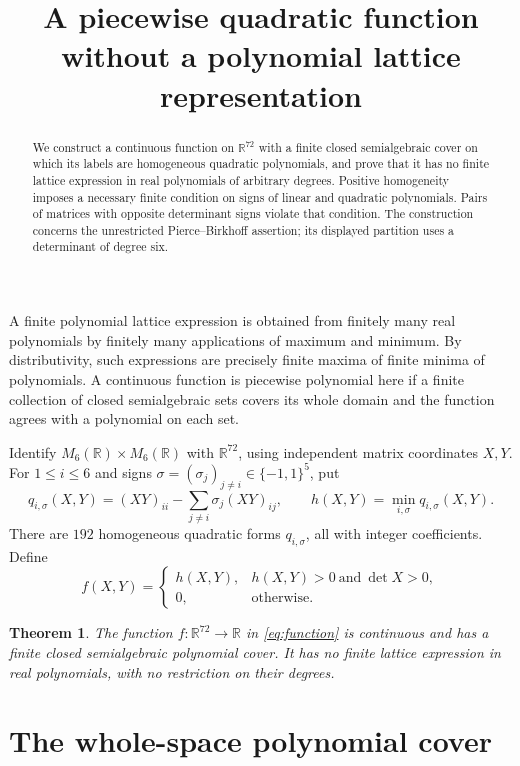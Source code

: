 \documentclass[11pt]{article}
\title{A piecewise quadratic function without a polynomial lattice representation}
\author{}
\date{}
\newcommand{\R}{\mathbb R}
\newcommand{\Mat}{M_6(\R)}
\newtheorem{theorem}{Theorem}
\begin{document}
\maketitle

\begin{abstract}
We construct a continuous function on \(\R^{72}\) with a finite closed
semialgebraic cover on which its labels are homogeneous quadratic
polynomials, and prove that it has no finite lattice expression in
real polynomials of arbitrary degrees. Positive homogeneity imposes
a necessary finite condition on signs of linear and quadratic
polynomials. Pairs of matrices with opposite determinant signs
violate that condition. The construction concerns the unrestricted
Pierce--Birkhoff assertion; its displayed partition uses a determinant
of degree six.
\end{abstract}

A finite polynomial lattice expression is obtained from finitely many
real polynomials by finitely many applications of maximum and minimum.
By distributivity, such expressions are precisely finite maxima of
finite minima of polynomials. A continuous function is piecewise
polynomial here if a finite collection of closed semialgebraic sets
covers its whole domain and the function agrees with a polynomial
on each set.

Identify \(\Mat\times\Mat\) with \(\R^{72}\), using independent matrix
coordinates \(X,Y\). For \(1\le i\le6\) and signs
\(\sigma=(\sigma_j)_{j\ne i}\in\{-1,1\}^5\), put
\[
 q_{i,\sigma}(X,Y)=(XY)_{ii}-\sum_{j\ne i}\sigma_j(XY)_{ij},
 \qquad
 h(X,Y)=\min_{i,\sigma}q_{i,\sigma}(X,Y).
\]
There are \(192\) homogeneous quadratic forms \(q_{i,\sigma}\), all
with integer coefficients. Define
\begin{equation}\label{eq:function}
 f(X,Y)=
 \begin{cases}
 h(X,Y),&h(X,Y)>0\ \text{and}\ \det X>0,\\
 0,&\text{otherwise}.
 \end{cases}
\end{equation}

\begin{theorem}\label{thm:main}
The function \(f:\R^{72}\to\R\) in \eqref{eq:function} is continuous
and has a finite closed semialgebraic polynomial cover. It has no
finite lattice expression in real polynomials, with no restriction
on their degrees.
\end{theorem}

\section{The whole-space polynomial cover}
\end{document}

